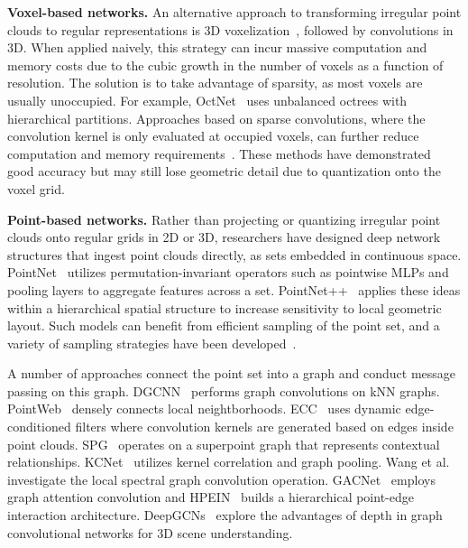 \documentclass[final]{cvpr}
\newcommand\mypara[1]{\vspace{1mm}\noindent\textbf{#1}}
\begin{document}
\mypara{Voxel-based networks.}
An alternative approach to transforming irregular point clouds to regular representations is 3D voxelization~\cite{maturana2015voxnet,song2016ssc}, followed by convolutions in 3D. When applied naively, this strategy can incur massive computation and memory costs due to the cubic growth in the number of voxels as a function of resolution. The solution is to take advantage of sparsity, as most voxels are usually unoccupied. For example, OctNet~\cite{riegler2017octnet} uses unbalanced octrees with hierarchical partitions. Approaches based on sparse convolutions, where the convolution kernel is only evaluated at occupied voxels, can further reduce computation and memory requirements~\cite{graham20183d,choy20194d}. These methods have demonstrated good accuracy but may still lose geometric detail due to quantization onto the voxel grid.

\mypara{Point-based networks.}
Rather than projecting or quantizing irregular point clouds onto regular grids in 2D or 3D, researchers have designed deep network structures that ingest point clouds directly, as sets embedded in continuous space.
PointNet~\cite{qi2017pointnet} utilizes permutation-invariant operators such as pointwise MLPs and pooling layers to aggregate features across a set. PointNet++~\cite{qi2017pointnet2} applies these ideas within a hierarchical spatial structure to increase sensitivity to local geometric layout.
Such models can benefit from efficient sampling of the point set, and a variety of sampling strategies have been developed~\cite{qi2017pointnet2,dovrat2019learning,wu2019pointconv,yang2019modeling,hu2020randla}.

A number of approaches connect the point set into a graph and conduct message passing on this graph. DGCNN~\cite{wang2019dgcnn} performs graph convolutions on kNN graphs. PointWeb~\cite{zhao2019pointweb} densely connects local neightborhoods.
ECC~\cite{simonovsky2017dynamic} uses dynamic edge-conditioned filters where convolution kernels are generated based on edges inside point clouds. SPG~\cite{landrieu2018spg} operates on a superpoint graph that represents contextual relationships. KCNet~\cite{shen2018mining} utilizes kernel correlation and graph pooling. Wang et al.~\cite{wang2018local} investigate the local spectral graph convolution operation. GACNet~\cite{wang2019graph} employs graph attention convolution and HPEIN~\cite{jiang2019hpein} builds a hierarchical point-edge interaction architecture. DeepGCNs~\cite{li2019deepgcns} explore the advantages of depth in graph convolutional networks for 3D scene understanding.
\end{document}
